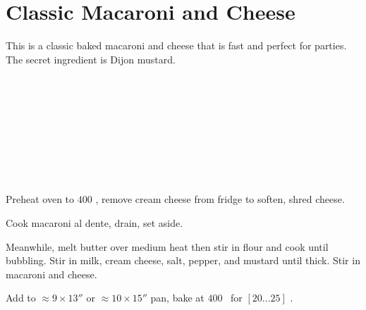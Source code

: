 \section[Classic Mac]{Classic Macaroni and Cheese}

\begin{recipestats}[
        servings=8 people,
        preptime=25 \minute,
        bakingtime=25 \minute,
        source=The Gieskens,
    ]
\end{recipestats}

\begin{recipeabstract}
    This is a classic baked macaroni and cheese that is fast and perfect for parties.
    The secret ingredient is Dijon mustard.
\end{recipeabstract}

\begin{ingredientcolumns}
    \begin{ingredientblock}
        \\
        \\
        \\
        \\
    \end{ingredientblock}
    \begin{ingredientblock}
        \\
        \\
        \\
    \end{ingredientblock}
\end{ingredientcolumns}

\begin{preparation}
\item Preheat oven to $400$ \Fahrenheit, remove cream cheese from fridge to soften, shred cheese.

\item Cook macaroni al dente, drain, set aside.

\item Meanwhile, melt butter over medium heat then stir in flour and cook until bubbling.
    Stir in milk, cream cheese, salt, pepper, and mustard until thick.
    Stir in macaroni and cheese.

\item Add to $\approx9\times13''$ or $\approx10\times15''$ pan, bake at $400$ \Fahrenheit~for $[20 \ldots 25]$ \minute.
\end{preparation}

\recipeend
